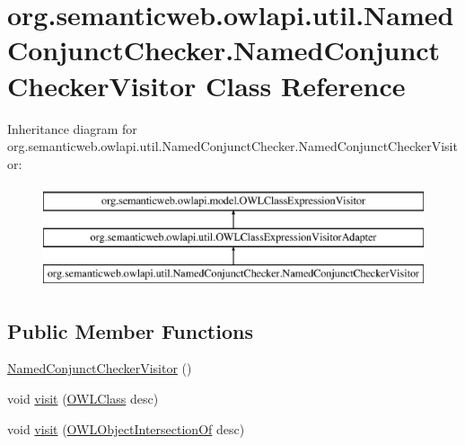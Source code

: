 \hypertarget{classorg_1_1semanticweb_1_1owlapi_1_1util_1_1_named_conjunct_checker_1_1_named_conjunct_checker_visitor}{\section{org.\-semanticweb.\-owlapi.\-util.\-Named\-Conjunct\-Checker.\-Named\-Conjunct\-Checker\-Visitor Class Reference}
\label{classorg_1_1semanticweb_1_1owlapi_1_1util_1_1_named_conjunct_checker_1_1_named_conjunct_checker_visitor}
}
Inheritance diagram for org.\-semanticweb.\-owlapi.\-util.\-Named\-Conjunct\-Checker.\-Named\-Conjunct\-Checker\-Visitor\-:\begin{figure}[H]
\begin{center}
\leavevmode
\includegraphics[height=3.000000cm]{classorg_1_1semanticweb_1_1owlapi_1_1util_1_1_named_conjunct_checker_1_1_named_conjunct_checker_visitor}
\end{center}
\end{figure}
\subsection*{Public Member Functions}
\begin{DoxyCompactItemize}
\item 
\hyperlink{classorg_1_1semanticweb_1_1owlapi_1_1util_1_1_named_conjunct_checker_1_1_named_conjunct_checker_visitor_aef8e3ab7e81e6f422d28a1a676bc53c8}{Named\-Conjunct\-Checker\-Visitor} ()
\item 
void \hyperlink{classorg_1_1semanticweb_1_1owlapi_1_1util_1_1_named_conjunct_checker_1_1_named_conjunct_checker_visitor_a23bb5003e093c4902dd7db8d15bef61f}{visit} (\hyperlink{interfaceorg_1_1semanticweb_1_1owlapi_1_1model_1_1_o_w_l_class}{O\-W\-L\-Class} desc)
\item 
void \hyperlink{classorg_1_1semanticweb_1_1owlapi_1_1util_1_1_named_conjunct_checker_1_1_named_conjunct_checker_visitor_ade3203ab13b8f95b7045b0ae4dd7d744}{visit} (\hyperlink{interfaceorg_1_1semanticweb_1_1owlapi_1_1model_1_1_o_w_l_object_intersection_of}{O\-W\-L\-Object\-Intersection\-Of} desc)
\end{DoxyCompactItemize}


